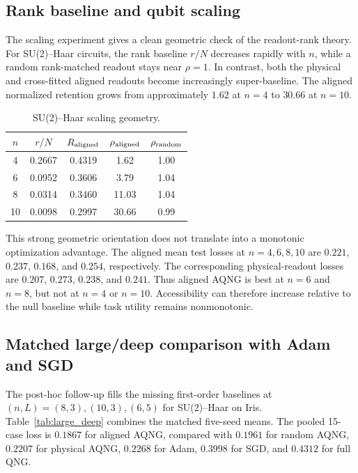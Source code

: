 \subsection{Rank baseline and qubit scaling}
The scaling experiment gives a clean geometric check of the readout-rank theory. For SU(2)--Haar circuits, the rank baseline $r/N$ decreases rapidly with $n$, while a random rank-matched readout stays near $\rho=1$. In contrast, both the physical and cross-fitted aligned readouts become increasingly super-baseline. The aligned normalized retention grows from approximately $1.62$ at $n=4$ to $30.66$ at $n=10$.

\begin{table}[t]
\centering
\caption{SU(2)--Haar scaling geometry.}
\label{tab:scaling_geometry}
\begin{tabular}{ccccc}
\toprule
$n$ & $r/N$ & $R_{\rm aligned}$ & $\rho_{\rm aligned}$ & $\rho_{\rm random}$ \\
\midrule
4  & 0.2667 & 0.4319 & 1.62 & 1.00 \\
6  & 0.0952 & 0.3606 & 3.79 & 1.04 \\
8  & 0.0314 & 0.3460 & 11.03 & 1.04 \\
10 & 0.0098 & 0.2997 & 30.66 & 0.99 \\
\bottomrule
\end{tabular}
\end{table}

This strong geometric orientation does not translate into a monotonic optimization advantage. The aligned mean test losses at $n=4,6,8,10$ are $0.221$, $0.237$, $0.168$, and $0.254$, respectively. The corresponding physical-readout losses are $0.207$, $0.273$, $0.238$, and $0.241$. Thus aligned AQNG is best at $n=6$ and $n=8$, but not at $n=4$ or $n=10$. Accessibility can therefore increase relative to the null baseline while task utility remains nonmonotonic.

\subsection{Matched large/deep comparison with Adam and SGD}
The post-hoc follow-up fills the missing first-order baselines at $(n,L)=(8,3),(10,3),(6,5)$ for SU(2)--Haar on Iris. Table~\ref{tab:large_deep} combines the matched five-seed means. The pooled 15-case loss is $0.1867$ for aligned AQNG, compared with $0.1961$ for random AQNG, $0.2207$ for physical AQNG, $0.2268$ for Adam, $0.3998$ for SGD, and $0.4312$ for full QNG.


